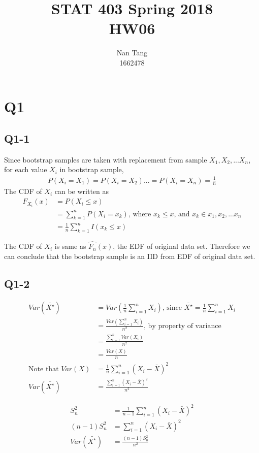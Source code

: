 \documentclass[12pt,letterpaper]{article}
\author{Nan Tang\\1662478}
\title{STAT 403 Spring 2018\\HW06}
\let\hat\widehat
\begin{document}
\maketitle

\section*{Q1}
\subsection*{Q1-1}
\noindent Since bootstrap samples are taken with replacement from sample $X_1, X_2, ... X_n$, for each value $X_i$ in bootstrap sample,
\begin{align*}
P(X_i = X_1) = P(X_i = X_2) ... = P(X_i = X_n) = \frac{1}{n}
\end{align*}
\noindent The CDF of $X_i$ can be written as 
\begin{align*}
F_{X_i}(x) &= P(X_i \leq x) \\
&= \sum_{k=1}^{n} P(X_i = x_k) \text{, where } x_k \leq x \text{, and } x_k \in {x_1, x_2, ... x_n} \\
&= \frac{1}{n} \sum_{k = 1}^{n} I(x_k \leq x)
\end{align*}

\noindent The CDF of $X_i$ is same as $\hat{F_n}(x)$, the EDF of original data set. Therefore we can conclude that the bootstrap sample is an IID from EDF of original data set. 

\subsection*{Q1-2}
\begin{align*}
Var(\bar{X^\star}) &= Var(\frac{1}{n} \sum_{i=1}^{n} X_i ) \text{, since } \bar{X^\star} = \frac{1}{n} \sum_{i=1}^{n} X_i \\
&= \frac{Var(\sum_{i=1}^{n} X_i)}{n^2} \text{, by property of variance} \\
&= \frac{\sum_{i=1}^{n} Var(X_i)}{n^2} \\
&= \frac{Var(X)}{n} \\
\text{Note that  } Var(X) &= \frac{1}{n} \sum_{i=1}^{n} (X_i - \bar{X})^2 \\
Var(\bar{X^\star}) &= \frac{\sum_{i=1}^{n}(X_i - \bar{X})^2}{n^2}
\end{align*}

\begin{align*}
S_n^2 &= \frac{1}{n-1} \sum_{i=1}^{n} (X_i - \bar{X})^2 \\
(n - 1) S_n^2 &= \sum_{i=1}^{n} (X_i - \bar{X})^2 \\
Var(\bar{X^\star}) &= \frac{(n-1) S_n^2}{n^2}
\end{align*}
\end{document}
